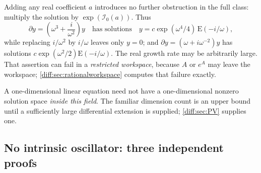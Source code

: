 \documentclass[11pt,letterpaper]{article}
\numberwithin{equation}{section}
\theoremstyle{definition}
\theoremstyle{remark}
\newcommand{\der}{\partial}
\newcommand{\Izero}{\mathcal I_{0}}
\newcommand{\Emm}{\mathrm{E}}
\begin{document}
\begin{remark}
\label{diff:rem:realnoobstruct}
Adding any real coefficient $a$ introduces no further obstruction in the full
class: multiply the solution by $\exp(\Izero(a))$. Thus
\[
 \der y=\left(\omega^{3}+\frac{i}{\omega^{2}}\right)y
 \quad\text{has solutions}\quad
 y=c\exp(\omega^{4}/4)\,\Emm(-i/\omega),
\]
while replacing $i/\omega^{2}$ by $i/\omega$ leaves only $y=0$; and
$\der y=(\omega+i\omega^{-2})y$ has solutions
$c\exp(\omega^{2}/2)\Emm(-i/\omega)$. The real growth rate may be arbitrarily
large. That assertion can fail in a \emph{restricted workspace}, because $A$
or $e^{A}$ may leave the workspace; \cref{diff:sec:rationalworkspace} computes
that failure exactly.
\end{remark}

\begin{remark}
\label{diff:rem:dimension}
A one-dimensional linear equation need not have a one-dimensional nonzero
solution space \emph{inside this field}. The familiar dimension count is an
upper bound until a sufficiently large differential extension is supplied;
\cref{diff:sec:PV} supplies one.
\end{remark}

\subsection{No intrinsic oscillator: three independent proofs}
\label{diff:sub:nooscillator}
\end{document}
